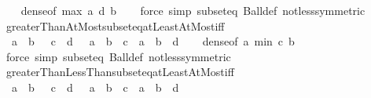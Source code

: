 \begin{isabellebody}
%
\isadelimproof
\ \ %
\endisadelimproof
%
\isatagproof
{}\isamarkupfalse%
\ dense{\isacharbrackleft}{\kern0pt}of\ {\isachardoublequoteopen}max\ a\ d{\isachardoublequoteclose}\ {\isachardoublequoteopen}b{\isachardoublequoteclose}{\isacharbrackright}{\kern0pt}\isanewline
\ \ \isamarkupfalse%
\ {\isacharparenleft}{\kern0pt}force\ simp{\isacharcolon}{\kern0pt}\ subset{\isacharunderscore}{\kern0pt}eq\ Ball{\isacharunderscore}{\kern0pt}def\ not{\isacharunderscore}{\kern0pt}less{\isacharbrackleft}{\kern0pt}symmetric{\isacharbrackright}{\kern0pt}{\isacharparenright}{\kern0pt}%
\endisatagproof
{\isafoldproof}%
%
\isadelimproof
\isanewline
%
\endisadelimproof
\isanewline
{}\isamarkupfalse%
\ greaterThanAtMost{\isacharunderscore}{\kern0pt}subseteq{\isacharunderscore}{\kern0pt}atLeastAtMost{\isacharunderscore}{\kern0pt}iff{\isacharcolon}{\kern0pt}\isanewline
\ \ {\isachardoublequoteopen}{\isacharbraceleft}{\kern0pt}a\ {\isacharless}{\kern0pt}{\isachardot}{\kern0pt}{\isachardot}{\kern0pt}\ b{\isacharbraceright}{\kern0pt}\ {\isasymsubseteq}\ {\isacharbraceleft}{\kern0pt}\ c\ {\isachardot}{\kern0pt}{\isachardot}{\kern0pt}\ d\ {\isacharbraceright}{\kern0pt}\ {\isasymlongleftrightarrow}\ {\isacharparenleft}{\kern0pt}a\ {\isacharless}{\kern0pt}\ b\ {\isasymlongrightarrow}\ c\ {\isasymle}\ a\ {\isasymand}\ b\ {\isasymle}\ d{\isacharparenright}{\kern0pt}{\isachardoublequoteclose}\isanewline
%
\isadelimproof
\ \ %
\endisadelimproof
%
\isatagproof
{}\isamarkupfalse%
\ dense{\isacharbrackleft}{\kern0pt}of\ {\isachardoublequoteopen}a{\isachardoublequoteclose}\ {\isachardoublequoteopen}min\ c\ b{\isachardoublequoteclose}{\isacharbrackright}{\kern0pt}\isanewline
\ \ \isamarkupfalse%
\ {\isacharparenleft}{\kern0pt}force\ simp{\isacharcolon}{\kern0pt}\ subset{\isacharunderscore}{\kern0pt}eq\ Ball{\isacharunderscore}{\kern0pt}def\ not{\isacharunderscore}{\kern0pt}less{\isacharbrackleft}{\kern0pt}symmetric{\isacharbrackright}{\kern0pt}{\isacharparenright}{\kern0pt}%
\endisatagproof
{\isafoldproof}%
%
\isadelimproof
\isanewline
%
\endisadelimproof
\isanewline
{}\isamarkupfalse%
\ greaterThanLessThan{\isacharunderscore}{\kern0pt}subseteq{\isacharunderscore}{\kern0pt}atLeastAtMost{\isacharunderscore}{\kern0pt}iff{\isacharcolon}{\kern0pt}\isanewline
\ \ {\isachardoublequoteopen}{\isacharbraceleft}{\kern0pt}a\ {\isacharless}{\kern0pt}{\isachardot}{\kern0pt}{\isachardot}{\kern0pt}{\isacharless}{\kern0pt}\ b{\isacharbraceright}{\kern0pt}\ {\isasymsubseteq}\ {\isacharbraceleft}{\kern0pt}\ c\ {\isachardot}{\kern0pt}{\isachardot}{\kern0pt}\ d\ {\isacharbraceright}{\kern0pt}\ {\isasymlongleftrightarrow}\ {\isacharparenleft}{\kern0pt}a\ {\isacharless}{\kern0pt}\ b\ {\isasymlongrightarrow}\ c\ {\isasymle}\ a\ {\isasymand}\ b\ {\isasymle}\ d{\isacharparenright}{\kern0pt}{\isachardoublequoteclose}\isanewline

\end{isabellebody}
